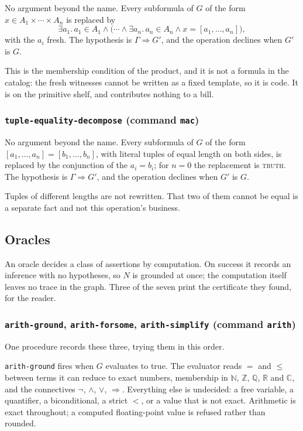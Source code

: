 No argument beyond the name.  Every subformula of $G$ of the form
$x \in A_1 \times \cdots \times A_n$ is replaced by
\[
  \exists a_1.\, a_1 \in A_1 \wedge
  \bigl(\cdots \wedge
  \exists a_n.\, a_n \in A_n \wedge x = [a_1, \ldots, a_n] \bigr),
\]
with the $a_i$ fresh.  The hypothesis is $\Gamma \Longrightarrow G'$, and
the operation declines when $G'$ is $G$.

This is the membership condition of the product, and it is not a formula
in the catalog: the fresh witnesses cannot be written as a fixed
template, so it is code.  It is on the primitive shelf, and contributes
nothing to a bill.

\subsubsection*{\texttt{tuple-equality-decompose} (command \texttt{mac})}

No argument beyond the name.  Every subformula of $G$ of the form
$[a_1, \ldots, a_n] = [b_1, \ldots, b_n]$, with literal tuples of equal
length on both sides, is replaced by the conjunction of the $a_i = b_i$;
for $n = 0$ the replacement is \textsc{truth}.  The hypothesis is
$\Gamma \Longrightarrow G'$, and the operation declines when $G'$ is $G$.

Tuples of different lengths are not rewritten.  That two of them cannot
be equal is a separate fact and not this operation's business.

\subsection{Oracles}

An oracle decides a class of assertions by computation.  On success it
records an inference with no hypotheses, so $N$ is grounded at once; the
computation itself leaves no trace in the graph.  Three of the seven
print the certificate they found, for the reader.

\subsubsection*{\texttt{arith-ground}, \texttt{arith-forsome},
  \texttt{arith-simplify} (command \texttt{arith})}

One procedure records these three, trying them in this order.

\texttt{arith-ground} fires when $G$ evaluates to true.  The evaluator
reads $=$ and $\leq$ between terms it can reduce to exact numbers,
membership in $\mathbb{N}$, $\mathbb{Z}$, $\mathbb{Q}$, $\mathbb{R}$ and
$\mathbb{C}$, and the connectives $\neg$, $\wedge$, $\vee$,
$\Rightarrow$.  Everything else is undecided: a free variable, a
quantifier, a biconditional, a strict $<$, or a value that is not exact.
Arithmetic is exact throughout; a computed floating-point value is
refused rather than rounded.

